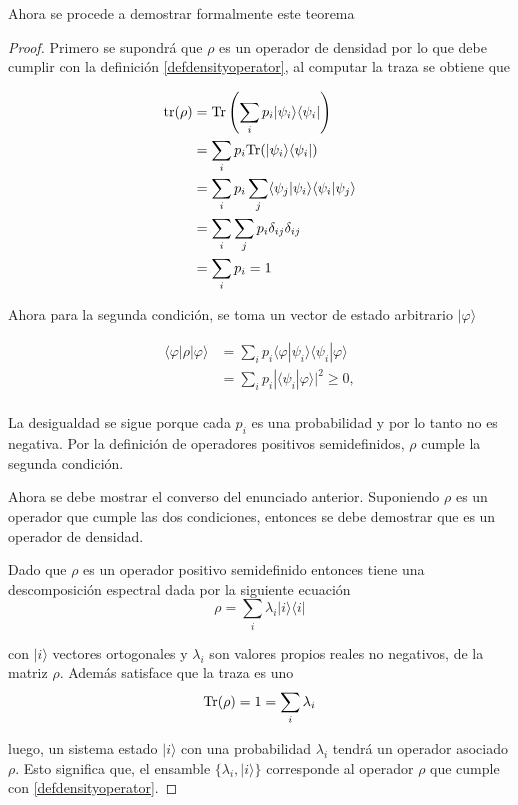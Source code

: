 Ahora se procede a demostrar formalmente este teorema


\begin{proof}
	Primero se supondrá que $\rho $ es un operador de densidad por lo que debe cumplir con la definición {\ref{defdensityoperator}}, al computar la traza se obtiene que
	
	
	
	\begin{equation*}
		\begin{split}
			{\rm tr(\rho)}&={\rm Tr}\left(\sum_{i} p_i|\psi_i\rangle \langle \psi_i|\right) \\
			&=	\sum_{i}p_i {\rm Tr}(|\psi_i\rangle \langle \psi_i|)\\
			&=\sum_{i}p_i \sum_j\langle \psi_j|\psi_i\rangle \langle \psi_i|\psi_j\rangle\\
			&=\sum_{i}\sum_j p_i \delta_{ij} \delta_{ij}\\
			&=\sum_i p_i=1\\
		\end{split}
	\end{equation*}

Ahora para la segunda condición, se toma un vector de estado arbitrario $|\varphi \rangle$

 
\begin{equation*}
	\begin{split}
	\langle \varphi |	\rho|\varphi \rangle&=\sum_{i}p_i\langle \varphi |\psi_i\rangle \langle \psi_i|\varphi \rangle \\
	&=\sum_{i}p_i| \langle \psi_i|\varphi \rangle|^2 \ge 0,\\
	\end{split}
\end{equation*}

La desigualdad se sigue porque cada $p_i$ es una probabilidad y por lo tanto no es negativa. Por la definición de operadores positivos semidefinidos, $\rho$ cumple la segunda condición.


Ahora se debe mostrar el converso del enunciado anterior. Suponiendo $\rho$ es un operador que cumple las dos condiciones, entonces se debe demostrar que es un operador de densidad.

Dado que $\rho$ es un operador positivo semidefinido entonces tiene una descomposición espectral dada por la siguiente ecuación {\cite{nielsen_chuang_2010}}
\[\rho=\sum_i \lambda_i |i\rangle \langle i|\]

con $|i\rangle$ vectores ortogonales y $\lambda_i$ son valores propios reales no negativos, de la matriz $\rho$. Además satisface que la traza es uno 
\[{\rm Tr}(\rho)=1=\sum_i\lambda_i\]

luego, un sistema estado $|i\rangle$ con una probabilidad $\lambda_i$ tendrá un operador asociado $\rho$. Esto significa que, el ensamble $\{\lambda_i, |i\rangle\}$  corresponde al operador $\rho$ que cumple con {\ref{defdensityoperator}}.


\end{proof}



